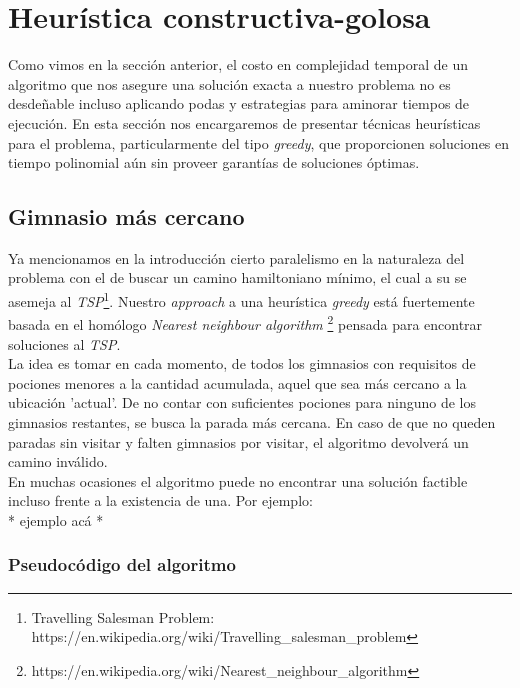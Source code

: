 \section{Heurística constructiva-golosa}
    Como vimos en la sección anterior, el costo en complejidad temporal de un algoritmo que nos asegure una solución exacta a nuestro problema no es desdeñable incluso aplicando podas y estrategias para aminorar tiempos de ejecución. En esta sección nos encargaremos de presentar técnicas heurísticas para el problema, particularmente del tipo \emph{greedy}, que proporcionen soluciones en tiempo polinomial aún sin proveer garantías de soluciones óptimas.

\subsection{Gimnasio más cercano}
    Ya mencionamos en la introducción cierto paralelismo en la naturaleza del problema con el de buscar un camino hamiltoniano mínimo, el cual a su se asemeja al \emph{TSP}\footnote{Travelling Salesman Problem: https://en.wikipedia.org/wiki/Travelling_salesman_problem}. Nuestro \emph{approach} a una heurística \emph{greedy} está fuertemente basada en el homólogo \emph{Nearest neighbour algorithm} \footnote{https://en.wikipedia.org/wiki/Nearest_neighbour_algorithm} pensada para encontrar soluciones al \emph{TSP}.
    \\

    La idea es tomar en cada momento, de todos los gimnasios con requisitos de pociones menores a la cantidad acumulada, aquel que sea más cercano a la ubicación 'actual'. De no contar con suficientes pociones para ninguno de los gimnasios restantes, se busca la parada más cercana. En caso de que no queden paradas sin visitar y falten gimnasios por visitar, el algoritmo devolverá un camino inválido.
    \\

    En muchas ocasiones el algoritmo puede no encontrar una solución factible incluso frente a la existencia de una. Por ejemplo:
    \\

    {\color{red} * ejemplo acá *}
    \\

\subsubsection{Pseudocódigo del algoritmo}

